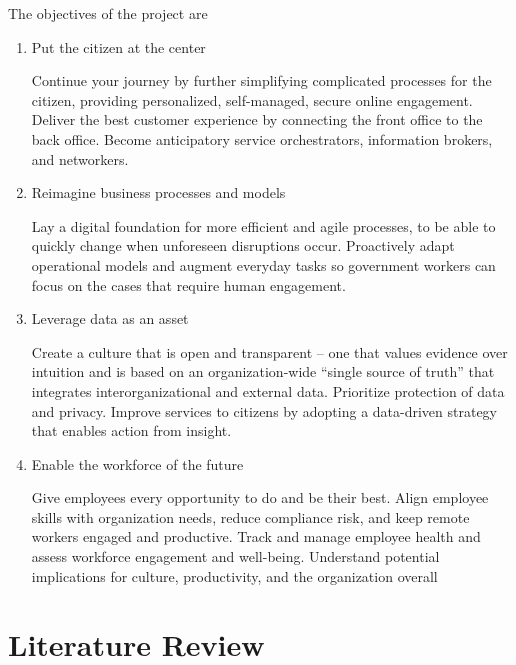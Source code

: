 The objectives of the project are
\begin{enumerate}
\item Put the citizen at the center

Continue your journey by further simplifying complicated
processes for the citizen, providing personalized, self-managed,
secure online engagement. Deliver the best customer experience
by connecting the front office to the back office. Become
anticipatory service orchestrators, information brokers, and
networkers.
\item Reimagine business processes and models

Lay a digital foundation for more efficient and agile processes,
to be able to quickly change when unforeseen disruptions
occur. Proactively adapt operational models and augment
everyday tasks so government workers can focus on the cases
that require human engagement.

\item Leverage data as an asset

Create a culture that is open and transparent – one that values
evidence over intuition and is based on an organization-wide
“single source of truth” that integrates interorganizational and
external data. Prioritize protection of data and privacy. Improve
services to citizens by adopting a data-driven strategy that
enables action from insight.

\item Enable the workforce of the future

Give employees every opportunity to do and be their best. Align
employee skills with organization needs, reduce compliance risk,
and keep remote workers engaged and productive. Track and
manage employee health and assess workforce engagement
and well-being. Understand potential implications for culture,
productivity, and the organization overall
\end{enumerate}

\section[Literature Review]{\textbf{Literature Review}}

